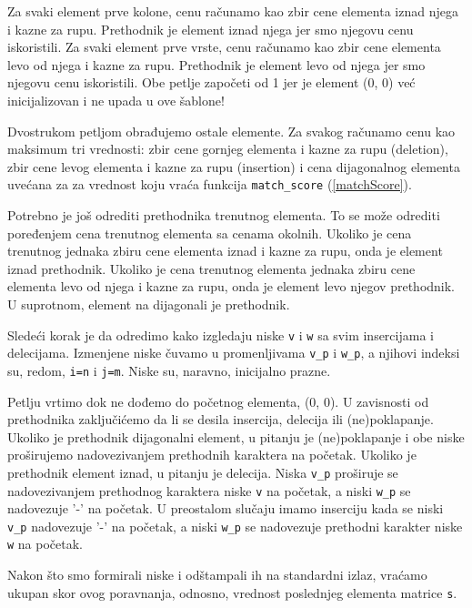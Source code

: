 Za svaki element prve kolone, cenu računamo kao zbir cene elementa iznad njega i kazne za rupu. Prethodnik je element iznad njega jer smo njegovu cenu iskoristili. Za svaki element prve vrste, cenu računamo kao zbir cene elementa levo od njega i kazne za rupu. Prethodnik je element levo od njega jer smo njegovu cenu iskoristili. Obe petlje započeti od 1 jer je element (0, 0) već inicijalizovan i ne upada u ove šablone!

Dvostrukom petljom obrađujemo ostale elemente. Za svakog računamo cenu kao maksimum tri vrednosti: zbir cene gornjeg elementa i kazne za rupu (deletion), zbir cene levog elementa i kazne za rupu (insertion) i cena dijagonalnog elementa uvećana za za vrednost koju vraća funkcija \texttt{match\_score} (\ref{matchScore}). 

Potrebno je još odrediti prethodnika trenutnog elementa. To se može odrediti poređenjem cena trenutnog elementa sa cenama okolnih. Ukoliko je cena trenutnog jednaka zbiru cene elementa iznad i kazne za rupu, onda je element iznad prethodnik. Ukoliko je cena trenutnog elementa jednaka zbiru cene elementa levo od njega i kazne za rupu, onda je element levo njegov prethodnik. U suprotnom, element na dijagonali je prethodnik.

Sledeći korak je da odredimo kako izgledaju niske \texttt{v} i \texttt{w} sa svim insercijama i delecijama. Izmenjene niske čuvamo u promenljivama \texttt{v\_p} i \texttt{w\_p}, a njihovi indeksi su, redom, \texttt{i=n} i \texttt{j=m}. Niske su, naravno, inicijalno prazne.

Petlju vrtimo dok ne dođemo do početnog elementa, (0, 0). U zavisnosti od prethodnika zaključićemo da li se desila insercija, delecija ili (ne)poklapanje. Ukoliko je prethodnik dijagonalni element, u pitanju je (ne)poklapanje i obe niske proširujemo nadovezivanjem prethodnih karaktera na početak. Ukoliko je prethodnik element iznad, u pitanju je delecija. Niska \texttt{v\_p} proširuje se nadovezivanjem prethodnog karaktera niske \texttt{v} na početak, a niski \texttt{w\_p} se nadovezuje '-' na početak. U preostalom slučaju imamo inserciju kada se niski \texttt{v\_p} nadovezuje '-' na početak, a niski \texttt{w\_p} se nadovezuje prethodni karakter niske \texttt{w} na početak.

Nakon što smo formirali niske i odštampali ih na standardni izlaz, vraćamo ukupan skor ovog poravnanja, odnosno, vrednost poslednjeg elementa matrice \texttt{s}.



